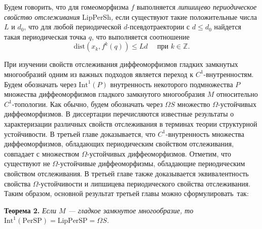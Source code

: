 \documentclass[12pt]{article}
\begin{document}
{%

Будем говорить, что для гомеоморфизма $f$ выполняется \textit{липшицево пе\-ри\-оди\-ческое свойство отслеживания} LipPerSh\textit{,} если существуют та\-кие положительные числа $L$ и $d_0$, что для любой периодической $d$-псев\-до\-тра\-ек\-тории с $d\leq d_0$ найдется такая периодическая точка $q$, что выполняется со\-отношение %
$$\mbox{dist}(x_k,f^k(q))\leq Ld\quad\mbox{ при }k\in\mathbb{Z}.$$
 
При изучении свойств отслеживания диффеоморфизмов гладких зам\-к\-ну\-тых многообразий одним из важных подходов является переход к $C^1$-внут\-рен\-ностям. Будем обозначать через $\mbox{Int}^1(P)$ внутренность некоторого под\-мно\-жества $P$ множества диффеоморфизмов гладкого зам\-кнутого мно\-го\-образия $M$ относительно $C^1$-топологии. Как обыч\-но, будем обоз\-на\-чать через $\Omega S$ множество $\Omega$-устойчивых диффео\-мор\-физмов. В дис\-сер\-та\-ции перечисляются известные результаты о ха\-рак\-теризации различных свойств отслеживания в терминах тео\-рии струк\-тур\-ной устойчивости. 
В третьей главе доказывается, что $C^1$-внут\-рен\-ность мно\-жес\-т\-ва диффеоморфизмов, обладающих периодическим свойст\-вом от\-сле\-жи\-вания, совпадает с множеством $\Omega$-устойчивых диф\-фео\-мор\-физ\-мов.
От\-ме\-тим, что существуют не $\Omega$-ус\-той\-чивые диффеоморфизмы, об\-ла\-да\-ющие периодическим свойством отслеживания.  %
В третьей гла\-ве также до\-ка\-зы\-вается эквивалентность свойства $\Omega$-устойчивости и липшицева периоди\-чес\-ко\-го свойства отслеживания. Таким образом, основной результат третьей главы можно сформулировать~так:

\textbf{Теорема 2.} \textit{Если $M$ --- гладкое замкнутое многообразие, то} 
$\mbox{Int}^1(\mbox{PerSP})=\mbox{LipPerSP}=\Omega S$\textit{.}

}
\end{document}
